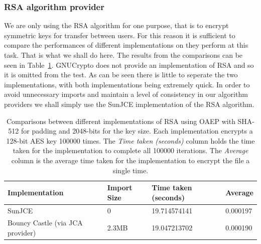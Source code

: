\documentclass[12pt, titlepage]{article}
\begin{document}
\subsubsection{RSA algorithm provider}
We are only using the RSA algorithm for one purpose, that is to encrypt symmetric keys for transfer between users. For this reason it is sufficient to compare the performances of different implementations on they perform at this task. That is what we shall do here.
\newline \indent The results from the comparisons can be seen in Table~\ref{tab:rsaComparison}. GNUCrypto does not provide an implementation of RSA and so it is omitted from the test. As can be seen there is little to seperate the two implementations, with both implementations being extremely quick.
\newline \indent In order to avoid unnecessary imports and maintain a level of consistency in our algorithm providers we shall simply use the SunJCE implementation of the RSA algorithm.

\begin{center}
\begin{table}[h!]
    \begin{tabular}{ | l | l | l | l |}
    \hline
    \textbf{Implementation} & \textbf{Import Size} & \textbf{Time taken (seconds)} & \textbf{Average} \\ \hline
    
    SunJCE & 0 & 19.714574141  & 0.000197 \\ \hline
    
     Bouncy Castle (via JCA provider) & 2.3MB & 19.047213702 & 0.000190 \\ \hline
    
    \end{tabular}
    \caption{Comparisons between different implementations of RSA using OAEP with SHA-512 for padding and 2048-bits for the key size. Each implementation encrypts a 128-bit AES key 100000 times. The \textit{Time taken (seconds)} column holds the time taken for the implementation to complete all 100000 iterations. The \textit{Average} column is the average time taken for the implementation to encrypt the file a single time.} \label{tab:rsaComparison}
    \end{table}
\end{center}
\end{document}
